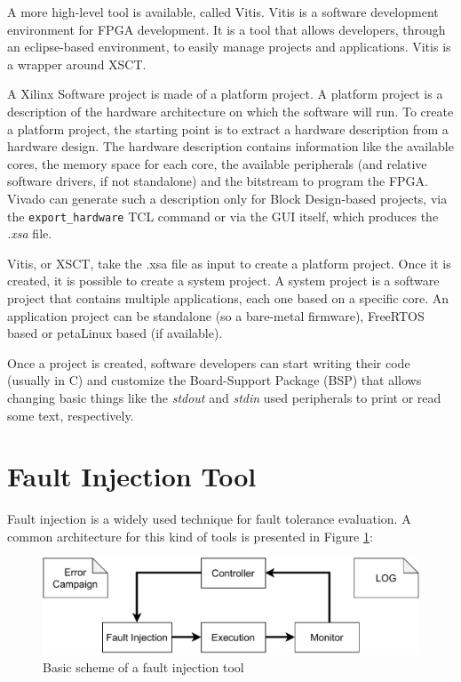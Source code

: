 A more high-level tool is available, called Vitis. Vitis is a software development environment for FPGA development. It is a tool that allows developers, through an eclipse-based environment, to easily manage projects and applications. Vitis is a wrapper around XSCT. \bigskip

A Xilinx Software project is made of a platform project. A platform project is a description of the hardware architecture on which the software will run. To create a platform project, the starting point is to extract a hardware description from a hardware design. The hardware description contains information like the available cores, the memory space for each core, the available peripherals (and relative software drivers, if not standalone) and the bitstream to program the FPGA. Vivado can generate such a description only for Block Design-based projects, via the \texttt{export\_hardware} TCL command or via the GUI itself, which produces the \textit{.xsa} file. \bigskip

Vitis, or XSCT, take the .xsa file as input to create a platform project. Once it is created, it is possible to create a system project. A system project is a software project that contains multiple applications, each one based on a specific core. An application project can be standalone (so a bare-metal firmware), FreeRTOS based or petaLinux based (if available). \bigskip

Once a project is created, software developers can start writing their code (usually in C) and customize the Board-Support Package (BSP) that allows changing basic things like the \textit{stdout} and \textit{stdin} used peripherals to print or read some text, respectively.

\section{Fault Injection Tool}
\label{sec:fitollo}

Fault injection is a widely used technique for fault tolerance evaluation. A common architecture for this kind of tools is presented in Figure \ref{fig:fi_example}:

\begin{figure}[H]
\centering
\includegraphics[width=0.95\linewidth]{images/chapter3/fi_env.pdf}
\caption{Basic scheme of a fault injection tool \cite{Ruano2021-wy}}
\label{fig:fi_example}
\end{figure}

